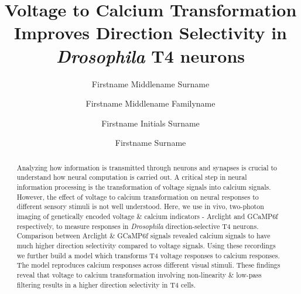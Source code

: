 \documentclass[9pt,lineno]{elife}
\title{Voltage to Calcium Transformation Improves Direction Selectivity in \textit{Drosophila} T4 neurons}
\author[1*]{Firstname Middlename Surname}
\author[1,2\authfn{1}\authfn{3}]{Firstname Middlename Familyname}
\author[2\authfn{1}\authfn{4}]{Firstname Initials Surname}
\author[2*]{Firstname Surname}
\affil[1]{Max Planck Institute of Neurobiology, Martinsried, Germany}
\begin{document}
\maketitle

\begin{abstract}
Analyzing how information is transmitted through neurons and synapses is crucial to understand how neural computation is carried out. A critical step in neural information processing is the transformation of voltage signals into calcium signals. However, the effect of voltage to calcium transformation on neural responses to different sensory stimuli is not well understood. Here, we use in vivo, two-photon imaging of genetically encoded voltage \& calcium indicators - Arclight and GCaMP6f respectively, to measure responses in \textit{Drosophila} direction-selective T4 neurons. Comparison between Arclight \& GCaMP6f signals revealed calcium signals to have much higher direction selectivity compared to voltage signals. Using these recordings we further build a model which transforms T4 voltage responses to calcium responses. The model reproduces calcium responses across different visual stimuli. These findings reveal that voltage to calcium transformation involving non-linearity \& low-pass filtering results in a higher direction selectivity in T4 cells.


\end{abstract}
\end{document}
